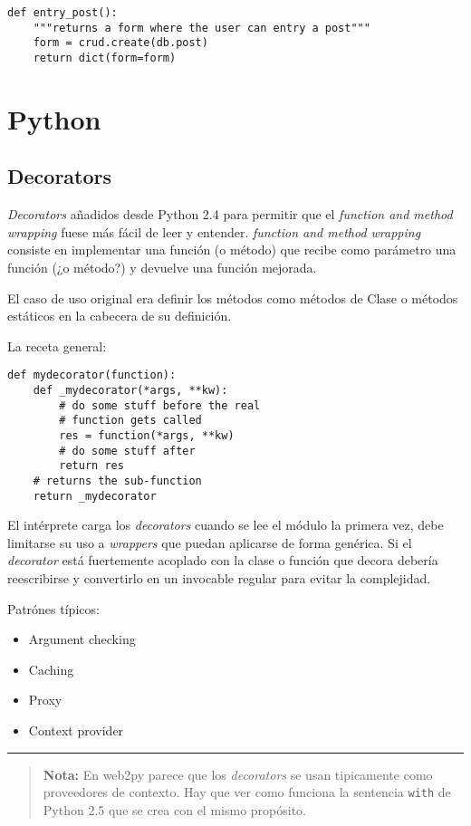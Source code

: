 \documentclass[12pt,spanish,]{article}
\providecommand{\tightlist}{%
  \setlength{\itemsep}{0pt}\setlength{\parskip}{0pt}}
\begin{document}
\begin{verbatim}
def entry_post():
    """returns a form where the user can entry a post"""
    form = crud.create(db.post)
    return dict(form=form)
\end{verbatim}

\hypertarget{python}{%
\section{Python}\label{python}}

\hypertarget{decorators}{%
\subsection{Decorators}\label{decorators}}

\emph{Decorators} añadidos desde Python 2.4 para permitir que el
\emph{function and method wrapping} fuese más fácil de leer y entender.
\emph{function and method wrapping} consiste en implementar una función
(o método) que recibe como parámetro una función (¿o método?) y devuelve
una función mejorada.

El caso de uso original era definir los métodos como métodos de Clase o
métodos estáticos en la cabecera de su definición.

La receta general:

\begin{verbatim}
def mydecorator(function):
    def _mydecorator(*args, **kw):
        # do some stuff before the real 
        # function gets called 
        res = function(*args, **kw)
        # do some stuff after
        return res
    # returns the sub-function
    return _mydecorator
\end{verbatim}

El intérprete carga los \emph{decorators} cuando se lee el módulo la
primera vez, debe limitarse su uso a \emph{wrappers} que puedan
aplicarse de forma genérica. Si el \emph{decorator} está fuertemente
acoplado con la clase o función que decora debería reescribirse y
convertirlo en un invocable regular para evitar la complejidad.

Patrónes típicos:

\begin{itemize}
\tightlist
\item
  Argument checking
\item
  Caching
\item
  Proxy
\item
  Context provider
\end{itemize}

\begin{center}\rule{0.5\linewidth}{\linethickness}\end{center}

\begin{quote}
\textbf{Nota:} En web2py parece que los \emph{decorators} se usan
tipicamente como proveedores de contexto. Hay que ver como funciona la
sentencia \texttt{with} de Python 2.5 que se crea con el mismo
propósito.
\end{quote}
\end{document}
